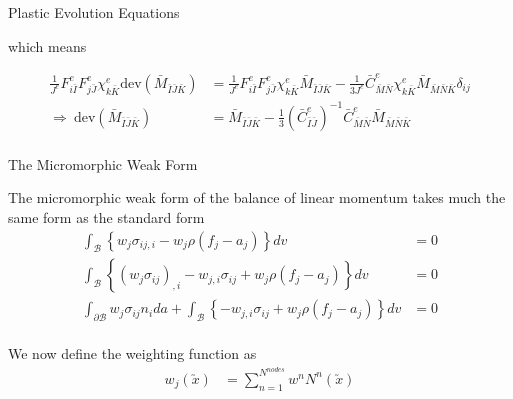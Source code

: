 \documentclass[11pt]{beamer}
\newcommand{\VEC}[1]{\utilde{#1}}
\newcommand{\dev}[1]{\text{dev}\left(#1\right)}
\begin{document}
\begin{frame}{Plastic Evolution Equations}

which means

\begin{align*}
\frac{1}{J^e} F_{i\bar{I}}^e F_{j\bar{J}}^e \chi_{k\bar{K}}^e \dev{\bar{M}_{\bar{I}\bar{J}\bar{K}}} &= \frac{1}{J^e} F_{i\bar{I}}^e F_{j\bar{J}}^e \chi_{k\bar{K}}^e \bar{M}_{\bar{I}\bar{J}\bar{K}} - \frac{1}{3J^e} \bar{C}_{\bar{M}\bar{N}}^e \chi_{k\bar{K}}^e \bar{M}_{\bar{M}\bar{N}\bar{K}}\delta_{ij}\\
\Rightarrow\ \dev{\bar{M}_{\bar{I}\bar{J}\bar{K}}} &= \bar{M}_{\bar{I}\bar{J}\bar{K}} - \frac{1}{3} \left(\bar{C}_{\bar{I}\bar{J}}^e\right)^{-1} \bar{C}_{\bar{M}\bar{N}}^e \bar{M}_{\bar{M}\bar{N}\bar{K}} \\
\end{align*}

\end{frame}

\begin{frame}{The Micromorphic Weak Form}

The micromorphic weak form of the balance of linear momentum takes much the same form as the standard form
\begin{align*}
\int_{\mathcal{B}} \left\{w_j \sigma_{ij,i} - w_j \rho\left(f_j - a_j\right)\right\} dv &= 0\\
\int_{\mathcal{B}} \left\{\left(w_j \sigma_{ij}\right)_{,i} - w_{j,i} \sigma_{ij} + w_j \rho \left(f_j - a_j \right)\right\} dv &= 0\\
\int_{\partial \mathcal{B}} w_j \sigma_{ij} n_i da + \int_{\mathcal{B}} \left\{- w_{j,i} \sigma_{ij} + w_j \rho \left(f_j - a_j\right) \right\} dv &= 0\\
\end{align*}

We now define the weighting function as
\begin{align*}
w_j\left(\VEC{x}\right) &= \sum_{n=1}^{N^{nodes}} w^n N^n \left(\VEC{x}\right)
\end{align*}

\end{frame}
\end{document}
